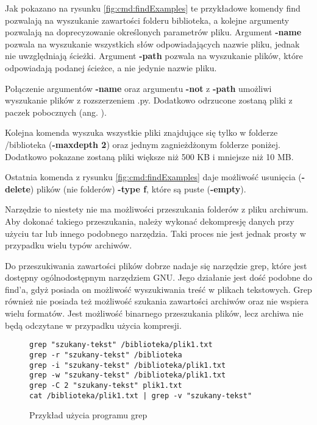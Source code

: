 Jak pokazano na rysunku \ref{fig:cmd:findExamples} te przykładowe komendy find
pozwalają na wyszukanie zawartości folderu biblioteka, a kolejne argumenty 
pozwalają na doprecyzowanie określonych parametrów pliku. Argument \textbf{-name}
pozwala na wyszukanie wszystkich słów odpowiadających nazwie pliku, jednak nie
uwzględniają ścieżki. Argument \textbf{-path} pozwala na wyszukanie plików, 
które odpowiadają podanej ścieżce, a nie jedynie nazwie pliku.

Połączenie argumentów \textbf{-name} oraz argumentu \textbf{-not} z \textbf{-path}
umożliwi wyszukanie plików z rozszerzeniem .py. Dodatkowo odrzucone zostaną 
pliki z paczek pobocznych (ang. ).

Kolejna komenda wyszuka wszystkie pliki znajdujące się tylko w folderze 
/biblioteka (\textbf{-maxdepth 2}) oraz jednym zagnieżdżonym folderze poniżej.
Dodatkowo pokazane zostaną pliki większe niż 500 KB i mniejsze niż 10 MB.

Ostatnia komenda z rysunku \ref{fig:cmd:findExamples} daje możliwość usunięcia 
(\textbf{-delete}) plików (nie folderów) \textbf{-type f}, które są puste (\textbf{-empty}).

Narzędzie to niestety nie ma możliwości przeszukania folderów z pliku
archiwum. Aby dokonać takiego przeszukania, należy wykonać dekompresję danych
przy użyciu tar lub innego podobnego narzędzia. Taki proces nie jest jednak 
prosty w przypadku wielu typów archiwów.

Do przeszukiwania zawartości plików dobrze nadaje się narzędzie grep, które jest
dostępny ogólnodostępnym narzędziem GNU. Jego działanie jest dość podobne do find'a,
gdyż posiada on możliwość wyszukiwania treść w plikach tekstowych. Grep również nie 
posiada też możliwość szukania zawartości archiwów oraz nie wspiera wielu 
formatów. Jest możliwość binarnego przeszukania plików, lecz archiwa nie będą 
odczytane w przypadku użycia kompresji.

\begin{figure}[h]
  \centering
\begin{tcolorbox}[
    colback=white,
    colframe=black,
    boxrule=0.5pt,
    arc=0pt
]
  \begin{verbatim}
grep "szukany-tekst" /biblioteka/plik1.txt 
grep -r "szukany-tekst" /biblioteka 
grep -i "szukany-tekst" /biblioteka/plik1.txt
grep -w "szukany-tekst" /biblioteka/plik1.txt
grep -C 2 "szukany-tekst" plik1.txt
cat /biblioteka/plik1.txt | grep -v "szukany-tekst" 
  \end{verbatim}
\end{tcolorbox}
\caption{Przykład użycia programu grep}
\label{fig:cmd:grepExamples}
\end{figure}

